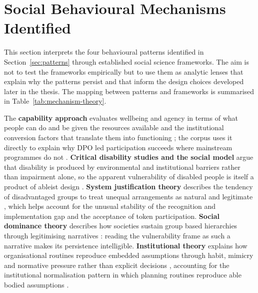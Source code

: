 \documentclass[12pt,a4paper]{report}
\begin{document}
\section{Social Behavioural Mechanisms Identified}
\label{sec:mechanisms}
This section interprets the four behavioural patterns identified in Section~\ref{sec:patterns} through established social science frameworks. The aim is not to test the frameworks empirically but to use them as analytic lenses that explain why the patterns persist and that inform the design choices developed later in the thesis. The mapping between patterns and frameworks is summarised in Table~\ref{tab:mechanism-theory}.

The \textbf{capability approach} evaluates wellbeing and agency in terms of what people can do and be given the resources available and the institutional conversion factors that translate them into functioning \cite{sen_1999_development,nussbaum_2011_capabilities}; the corpus uses it directly to explain why DPO led participation succeeds where mainstream programmes do not \cite{ton2021agency,villeneuve2021pcep,doll2025assam}. \textbf{Critical disability studies and the social model} argue that disability is produced by environmental and institutional barriers rather than impairment alone, so the apparent vulnerability of disabled people is itself a product of ableist design \cite{oliver_1990_politics,stjernholm2025critical,setijaningrum2024tokenism}. \textbf{System justification theory} describes the tendency of disadvantaged groups to treat unequal arrangements as natural and legitimate \cite{jost_2003_decade,Akike2025}, which helps account for the unusual stability of the recognition and implementation gap and the acceptance of token participation. \textbf{Social dominance theory} describes how societies sustain group based hierarchies through legitimising narratives \cite{sidanius_pratto_1999_socdom,Murcott2025,Harpur2025}: reading the vulnerability frame as such a narrative makes its persistence intelligible. \textbf{Institutional theory} explains how organisational routines reproduce embedded assumptions through habit, mimicry and normative pressure rather than explicit decisions \cite{dimaggio_powell_1983_ironcage}, accounting for the institutional normalisation pattern in which planning routines reproduce able bodied assumptions \cite{brown2025massachusetts,gershon2021fema,lunga2019zimbabwe}.
\end{document}
